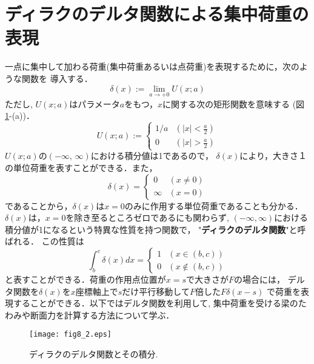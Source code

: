 \documentclass[10pt,a4j]{jarticle}
\begin{document}
\section{ディラクのデルタ関数による集中荷重の表現}
一点に集中して加わる荷重(集中荷重あるいは点荷重)を表現するために，次のような関数を
導入する．
\begin{equation}
	\delta  (x) := \lim _ {a\rightarrow +0} U(x;a)
	\label{eqn:delta_x}
\end{equation}
ただし, $U(x;a)$はパラメータ$a$をもつ，$x$に関する次の矩形関数を意味する
(図\ref{fig:fig8_2}-(a))．
\begin{equation}
	U(x;a):=\left\{
		\begin{array}{cc}
			1/a & \left(\left| x \right| < \frac{a}{2} \right) \\
			0 & \left(\left| x \right| > \frac{a}{2} \right) 
		\end{array}
		\right.
	\label{eqn:def_U}
\end{equation}
$U(x;a)$の$(-\infty,\,\infty)$における積分値は1であるので，
$\delta(x)$により，大きさ１の単位荷重を表すことができる．また，
\begin{equation}
	\delta(x)=\left\{
		\begin{array}{cc}
			0 & \left(x\neq 0\right) \\
			\infty & \left(x=0 \right) 
		\end{array}
		\right.
	\label{eqn:delta_x_val}
\end{equation}
であることから，$\delta(x)$は$x=0$のみに作用する単位荷重であることも分かる．
$\delta(x)$は，$x=0$を除き至るところゼロであるにも関わらず, 
$(-\infty,\infty)$における積分値が1になるという特異な性質を持つ関数で，
"{\bf ディラクのデルタ関数}"と呼ばれる．
この性質は
\begin{equation}
	\int _b^c \delta(x) dx = \left\{
	\begin{array}{cc}
		1 & \left( x \in (b,c)\right) \\ 
		0 & \left( x \notin (b,c)\right)
	\end{array}
	\label{eqn:idelta_ab}
	\right.
\end{equation}
と表すことができる．荷重の作用点位置が$x=s$で大きさが$F$の場合には，
デルタ関数を$\delta(x)$を$x$座標軸上で$s$だけ平行移動して$F$倍した$F\delta (x-s)$
で荷重を表現することができる．以下ではデルタ関数を利用して, 集中荷重を受ける梁のたわみや断面力を計算する方法について学ぶ．
\begin{figure}
	\begin{center}
	\texttt{[image: fig8\_2.eps]} 
	\end{center}
	\caption{
		ディラクのデルタ関数とその積分.
	 } 
	\label{fig:fig8_2}
\end{figure}
\end{document}
